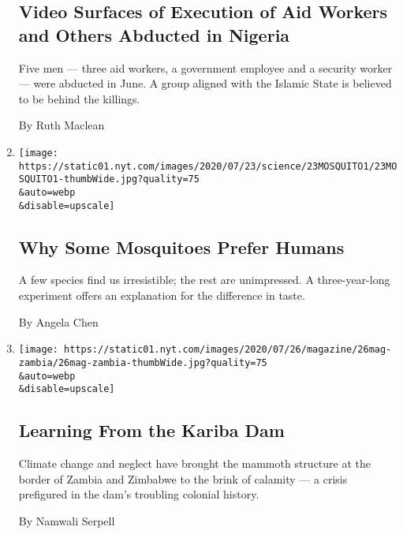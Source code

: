 \begin{enumerate}
  \hypertarget{video-surfaces-of-execution-of-aid-workers-and-others-abducted-in-nigeria}{%
  \subsection{Video Surfaces of Execution of Aid Workers and Others
  Abducted in
  Nigeria}\label{video-surfaces-of-execution-of-aid-workers-and-others-abducted-in-nigeria}}

  Five men --- three aid workers, a government employee and a security
  worker --- were abducted in June. A group aligned with the Islamic
  State is believed to be behind the killings.

  By Ruth Maclean
\item
  \href{/2020/07/23/science/mosquitoes-genetics-africa.html}{}

  \texttt{[image: https://static01.nyt.com/images/2020/07/23/science/23MOSQUITO1/23MOSQUITO1-thumbWide.jpg?quality=75\\\&auto=webp\\\&disable=upscale]}

  \hypertarget{why-some-mosquitoes-prefer-humans}{%
  \subsection{Why Some Mosquitoes Prefer
  Humans}\label{why-some-mosquitoes-prefer-humans}}

  A few species find us irresistible; the rest are unimpressed. A
  three-year-long experiment offers an explanation for the difference in
  taste.

  By Angela Chen
\item
  \href{/interactive/2020/07/22/magazine/zambia-kariba-dam.html}{}

  \texttt{[image: https://static01.nyt.com/images/2020/07/26/magazine/26mag-zambia/26mag-zambia-thumbWide.jpg?quality=75\\\&auto=webp\\\&disable=upscale]}

  \hypertarget{learning-from-the-kariba-dam}{%
  \subsection{Learning From the Kariba
  Dam}\label{learning-from-the-kariba-dam}}

  Climate change and neglect have brought the mammoth structure at the
  border of Zambia and Zimbabwe to the brink of calamity --- a crisis
  prefigured in the dam's troubling colonial history.

  By Namwali Serpell
\end{enumerate}

